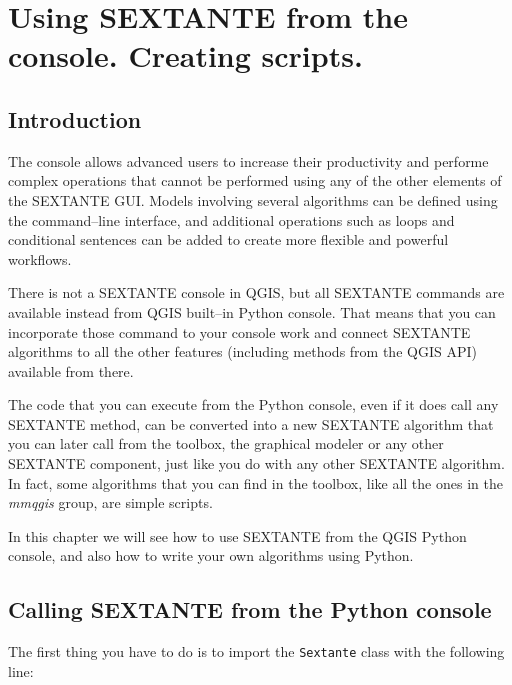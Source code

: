 \chapter{Using SEXTANTE from the console. Creating scripts.}

\section{Introduction}

The console allows advanced users to increase their productivity and performe complex operations that cannot be performed using any of the other elements of the SEXTANTE GUI. Models involving several algorithms can be defined using the command--line interface, and additional operations such as loops and conditional sentences can be added to create more flexible and powerful workflows.

There is not a SEXTANTE console in QGIS, but all SEXTANTE commands are available instead from QGIS built--in Python console. That means that you can incorporate those command to your console work and connect SEXTANTE algorithms to all the other features (including methods from the QGIS API) available from there.

The code that you can execute from the Python console, even if it does call any SEXTANTE method, can be converted into a new  SEXTANTE algorithm that you can later call from the toolbox, the graphical modeler or any other SEXTANTE component, just like you do with any other SEXTANTE algorithm. In fact, some algorithms that you can find in the toolbox, like all the ones in the \emph{mmqgis} group, are simple scripts.

In this chapter we will see how to use SEXTANTE from the QGIS Python console, and also how to write your own algorithms using Python.


\section{Calling SEXTANTE from the Python console}

The first thing you have to do is to import the \texttt{Sextante} class with the following line:

